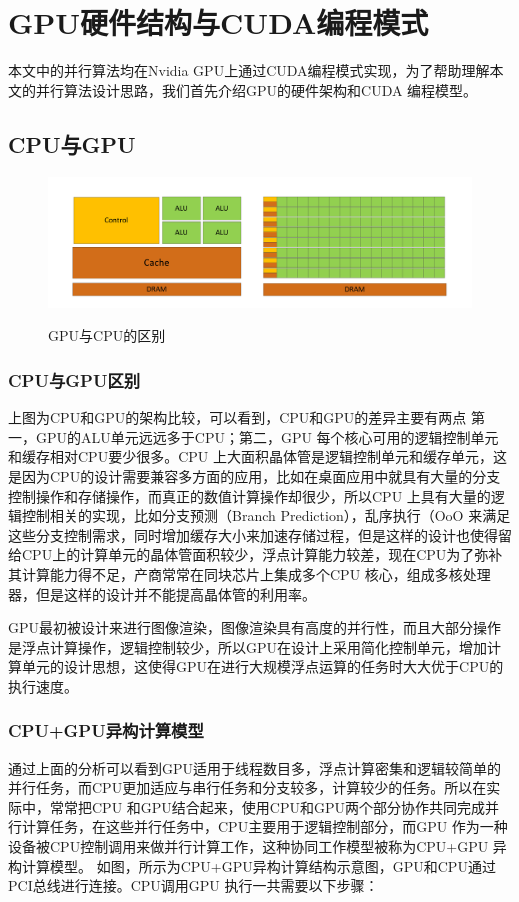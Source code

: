 \chapter{GPU硬件结构与CUDA编程模式}
本文中的并行算法均在Nvidia GPU上通过CUDA编程模式实现，为了帮助理解本文的并行算法设计思路，我们首先介绍GPU的硬件架构和CUDA 编程模型。
\section{CPU与GPU}
\begin{figure}
\setlength{\belowcaptionskip}{-0.5cm}
  \begin{center}
    {\includegraphics[width=1 \textwidth]{figures/GPU&CPU.pdf}}
    \end{center}
  \caption{{\footnotesize{GPU与CPU的区别}}}
  \label{GCD}
\end{figure}
\subsection{CPU与GPU区别}

上图为CPU和GPU的架构比较，可以看到，CPU和GPU的差异主要有两点 第一，GPU的ALU单元远远多于CPU；第二，GPU 每个核心可用的逻辑控制单元和缓存相对CPU要少很多。CPU 上大面积晶体管是逻辑控制单元和缓存单元，这是因为CPU的设计需要兼容多方面的应用，比如在桌面应用中就具有大量的分支控制操作和存储操作，而真正的数值计算操作却很少，所以CPU 上具有大量的逻辑控制相关的实现，比如分支预测（Branch Prediction），乱序执行（OoO 来满足这些分支控制需求，同时增加缓存大小来加速存储过程，但是这样的设计也使得留给CPU上的计算单元的晶体管面积较少，浮点计算能力较差，现在CPU为了弥补其计算能力得不足，产商常常在同块芯片上集成多个CPU 核心，组成多核处理器，但是这样的设计并不能提高晶体管的利用率。

GPU最初被设计来进行图像渲染，图像渲染具有高度的并行性，而且大部分操作是浮点计算操作，逻辑控制较少，所以GPU在设计上采用简化控制单元，增加计算单元的设计思想，这使得GPU在进行大规模浮点运算的任务时大大优于CPU的执行速度。
\subsection{CPU+GPU异构计算模型}
通过上面的分析可以看到GPU适用于线程数目多，浮点计算密集和逻辑较简单的并行任务，而CPU更加适应与串行任务和分支较多，计算较少的任务。所以在实际中，常常把CPU 和GPU结合起来，使用CPU和GPU两个部分协作共同完成并行计算任务，在这些并行任务中，CPU主要用于逻辑控制部分，而GPU 作为一种设备被CPU控制调用来做并行计算工作，这种协同工作模型被称为CPU+GPU 异构计算模型。
如图，所示为CPU+GPU异构计算结构示意图，GPU和CPU通过PCI总线进行连接。CPU调用GPU 执行一共需要以下步骤：

